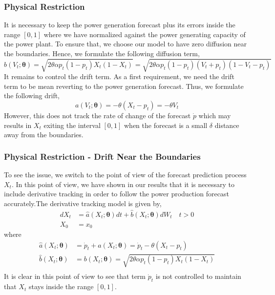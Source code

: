 \documentclass[aspectratio=169]{beamer}\usepackage[utf8]{inputenc}
\begin{document}
\begin{frame}\frametitle{ Physical  Restriction }
It is necessary to keep  the power generation forecast plus its errors  inside the range $[0,1]$ where we have normalized against the power generating capacity of the power plant.  To ensure that, we choose our model to have zero diffusion near the boundaries. Hence, we  formulate the following diffusion  term, 
\begin{equation*}
b(V_t; \bm{\theta}) =  \sqrt{2 \theta \alpha p_t(1-p_t) X_t (1-X_t)}    = \sqrt{2 \theta \alpha p_t(1-p_t) (V_t +p_t ) (1-V_t-p_t)}  
\end{equation*}
It remains to control the drift term. As a first requirement, we need the drift term to be mean reverting to the power generation forecast. Thus, we formulate the following drift, 
\begin{equation}
a(V_t; \bm{\theta}) =  - \theta (X_t - p_t)= - \theta V_t 
\end{equation}
However, this does not track the rate of change of the forecast $\dot{p}$ which may results in $X_t$ exiting the interval $[0,1]$ when the forecast is a small $\delta$ distance away from the boundaries. 
\end{frame}


\begin{frame}\frametitle{ Physical  Restriction - Drift Near the Boundaries}
To see the issue, we switch to the point of view of the forecast prediction process $X_t$.  In this point of view, we have shown in our results that it is necessary to include derivative tracking in order to follow the power production forecast accurately.The derivative tracking model is given by,
\begin{equation}
\begin{split}
dX_t &= \hat{a}(X_t; \bm{\theta}) dt + \hat{b} (X_t; \bm{\theta} ) dW_t \quad t > 0 \\
X_0 & = x_0
\end{split}\label{main_X}
\end{equation}
where 
\begin{equation}
\begin{split}
\hat{a}(X_t; \bm{\theta}) &= \dot{p}_t + a(X_t; \bm{\theta}) =  \dot{p}_t - \theta \left(X_t - p_t\right)   \\
\hat{b}(X_t; \bm{\theta}) &=  b(X_t; \bm{\theta}) =  \sqrt{2 \theta \alpha p_t(1-p_t) X_t (1-X_t)}    \\
\end{split}
\end{equation}
It is clear in this point of view to see that  term $\dot{p}_t $ is not controlled to maintain that $X_t$ stays inside the  range $[0,1]$.
\end{frame}
\end{document}
